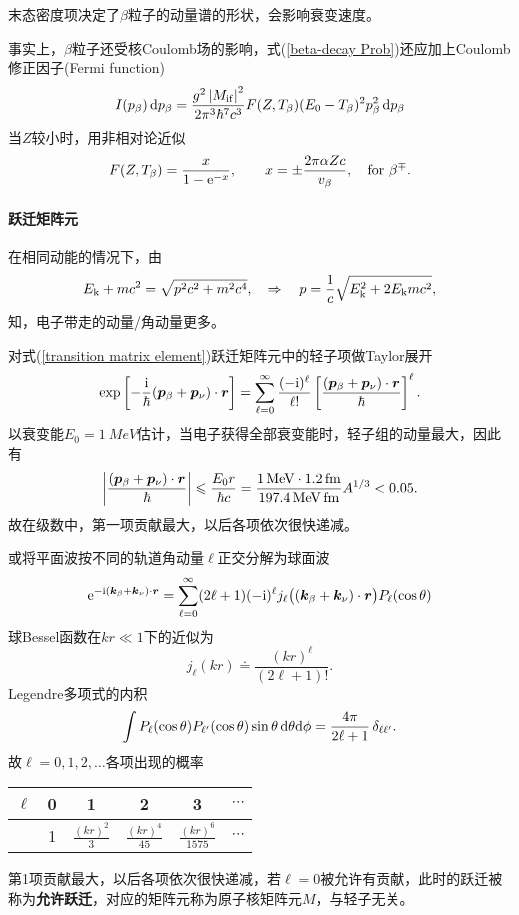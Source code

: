 末态密度项决定了$\beta$粒子的动量谱的形状，会影响衰变速度。

事实上，$\beta$粒子还受核Coulomb场的影响，式(\ref{beta-decay Prob})还应加上Coulomb修正因子(Fermi function)
\begin{align}\label{Fermi funtion}
	I(p_\beta)\mathop{}\!\mathrm{d} p_\beta=\frac{g^2\left\lvert M_{\mathrm{i}\mathrm{f}}\right\rvert^2}{2\pi^3\hbar^7c^3}F(Z,T_\beta)(E_0-T_\beta)^2p_\beta^2\mathop{}\!\mathrm{d} p_\beta
\end{align}
当$Z$较小时，用非相对论近似
\[
	F(Z,T_\beta)=\frac x{1-\mathop{}\!\mathrm{e}^{-x}},\qquad x=\pm\frac{2\pi\alpha Zc}{v_\beta},\quad\text{for}~\beta^\mp.
\]
\paragraph{跃迁矩阵元}在相同动能的情况下，由
\[
	E_{\mathrm k}+mc^2=\sqrt{p^2c^2+m^2c^4},\quad\Rightarrow\quad p=\frac1c\sqrt{E_{\mathrm k}^2+2E_{\mathrm k} mc^2},
\]
知，电子带走的动量/角动量更多。

对式(\ref{transition matrix element})跃迁矩阵元中的轻子项做Taylor展开
\begin{align*}
	\exp\left[-\frac{\mathrm{i}}\hbar(\bm p_\beta+\bm p_\nu)\cdot\bm r\right]=\sum_{\ell=0}^\infty\frac{(-\mathrm{i})^\ell}{\ell!}\left[\frac{(\bm p_\beta+\bm p_\nu)\cdot\bm r}\hbar\right]^\ell.
\end{align*}
以衰变能$E_0=\SI{1}{MeV}$估计，当电子获得全部衰变能时，轻子组的动量最大，因此有
\[
	\left\lvert\frac{(\bm p_\beta+\bm p_\nu)\cdot\bm r}\hbar\right\rvert\leqslant\frac{E_0r}{\hbar c}=\frac{\SI{1}{MeV}\cdot\SI{1.2}{fm}}{\SI{197.4}{MeV.fm}}A^{1/3}<0.05.
\]
故在级数中，第一项贡献最大，以后各项依次很快递减。

或将平面波按不同的轨道角动量$\ell$正交分解为球面波
\[
	\mathop{}\!\mathrm{e}^{-\mathrm{i}(\bm k_\beta+\bm k_\nu)\cdot\bm r}=\sum_{\ell=0}^\infty(2\ell+1)(-\mathrm{i})^\ell j_\ell\bigl((\bm k_\beta+\bm k_\nu)\cdot\bm r\bigr)P_\ell(\cos\theta)
\]
球Bessel函数在$kr\ll 1$下的近似为
\[
	j_\ell(kr)\doteq\frac{(kr)^\ell}{(2\ell+1)!}.
\]
Legendre多项式的内积
\[
	\int P_\ell(\cos\theta)P_{\ell'}(\cos\theta)\sin\theta\mathop{}\!\mathrm{d}\theta\mathrm{d}\phi=\frac{4\pi}{2\ell+1}\mathop{}\!\delta_{\ell\ell'}.
\]
故$\ell=0,1,2,\ldots$各项出现的概率
\begin{center}
	\begin{tabular}{cccccc}
		\toprule
		$\ell$&0&1&2&3&$\cdots$\\
		\midrule
		&1&$\frac{(kr)^2}3$&$\frac{(kr)^4}{45}$&$\frac{(kr)^6}{1575}$&$\cdots$\\
		\bottomrule
	\end{tabular}
\end{center}
第1项贡献最大，以后各项依次很快递减，若$\ell=0$被允许有贡献，此时的跃迁被称为\textbf{允许跃迁}，对应的矩阵元称为原子核矩阵元$M$，与轻子无关。

